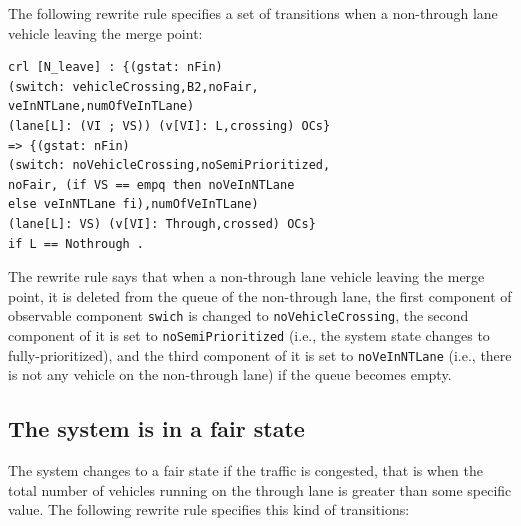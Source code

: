 \documentclass[10pt, conference, compsocconf]{IEEEtran}
\begin{document}
The following rewrite rule specifies a set of transitions when a non-through lane vehicle leaving the merge point:

\begin{small}
\begin{verbatim}
crl [N_leave] : {(gstat: nFin) 
(switch: vehicleCrossing,B2,noFair,
veInNTLane,numOfVeInTLane) 
(lane[L]: (VI ; VS)) (v[VI]: L,crossing) OCs} 
=> {(gstat: nFin) 
(switch: noVehicleCrossing,noSemiPrioritized,
noFair, (if VS == empq then noVeInNTLane 
else veInNTLane fi),numOfVeInTLane) 
(lane[L]: VS) (v[VI]: Through,crossed) OCs} 
if L == Nothrough .
\end{verbatim}
\end{small}

\noindent
The rewrite rule says that when a non-through lane vehicle leaving the merge point, it is deleted from the queue of the non-through lane, the first component of observable component \verb!swich! is changed to \verb!noVehicleCrossing!, the second component of it is set to \verb!noSemiPrioritized! (i.e., the system state changes to fully-prioritized), and the third component of it is set to \verb!noVeInNTLane! (i.e., there is not any vehicle on the non-through lane) if the queue becomes empty.



\subsection{The system is in a fair state}
The system changes to a fair state if the traffic is congested, that is when the total number of vehicles running on the through lane is greater than some specific value.
The following rewrite rule specifies this kind of transitions:

%

\end{document}
